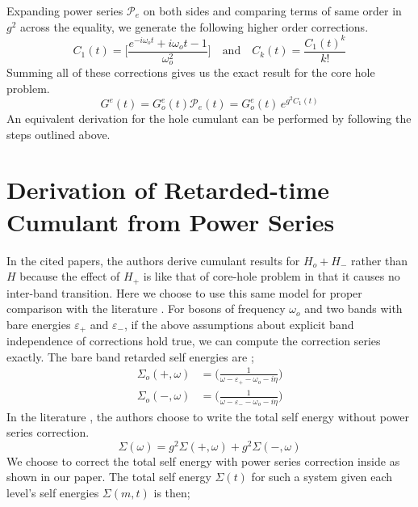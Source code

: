 \documentclass{article}
\begin{document}
Expanding power series $\mathcal{P}_e$ on both sides and comparing terms of same order in $g^2$ across the equality, we generate the following higher order corrections.
\begin{equation*}
    C_1(t) =  \Big[\frac{e^{-i\omega_o t} + i\omega_o t -1}{\omega_o^2}\Big] \quad \text{and}\quad C_k (t) = \frac{C_1(t)^k}{k!}
\end{equation*}
Summing all of these corrections gives us the exact result for the core hole problem.
\begin{equation}
G^e(t) = G_o^e(t)\mathcal{P}_e(t) = G_o^e(t)\,e^{g^2 C_1(t)}
\label{core-hole-cumulant}
\end{equation}
An equivalent derivation for the hole cumulant can be performed by following the steps outlined above.


\section{Derivation of Retarded-time Cumulant from Power Series}
In the cited papers, the authors derive cumulant results for $H_o + H_-$ rather than $H$ because the effect of $H_+$ is like that of core-hole problem in that it causes no inter-band transition. Here we choose to use this same model for proper comparison with the literature \cite{zhou_cumulant_2018}.
For bosons of frequency $\omega_o$ and two bands with bare energies $\varepsilon_{+}$ and $\varepsilon_{-}$, if the above assumptions about explicit band independence of corrections hold true, we can compute the correction series exactly. The bare band retarded self energies are \cite{zhou_cumulant_2018, gunnarsson_corrections_1994};
\begin{equation*}
\begin{aligned}
    \Sigma_o(+,\omega) &=  \Big(\frac{1}{\omega - \varepsilon_{+} - \omega_o -i \eta}\Big)\\
    \Sigma_o(-,\omega) &=  \Big(\frac{1}{\omega - \varepsilon_{-} - \omega_o -i \eta}\Big) 
\end{aligned}
\end{equation*}
In the literature \cite{zhou_cumulant_2018}, the authors choose to write the total self energy without power series correction.
\begin{equation}
    \Sigma(\omega) = g^2 \Sigma(+,\omega) + g^2 \Sigma(-,\omega)
\end{equation}
We choose to correct the total self energy with power series correction inside as shown in our paper. The total self energy $\Sigma(t)$ for such a system given each level's self energies $\Sigma(m,t)$ is then;
\end{document}
